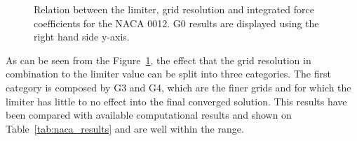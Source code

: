 \begin{figure}[]
    \begin{subfigmatrix}{2}
        \label{fig:lim_drag_AoA15}
        \label{fig:lim_lift_AoA15}
      \end{subfigmatrix}
  \caption{Relation between the limiter, grid resolution and integrated force coefficients for the NACA 0012. G0 results are displayed using the right hand side y-axis.}
  \label{fig:lim_grid}
\end{figure}

As can be seen from the Figure~\ref{fig:lim_grid}, the effect that the grid resolution in combination to the limiter value can be split into three categories. The first category is composed by G3 and G4, which are the finer grids and for which the limiter has little to no effect into the final converged solution. This results have been compared with available computational results and shown on Table~\ref{tab:naca_results} and are well within the range.

